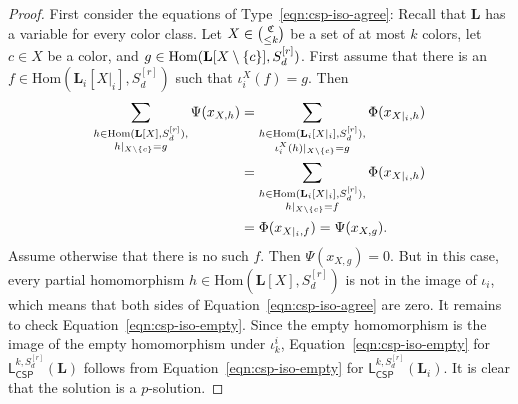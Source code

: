 \documentclass[a4paper,english, thm-restate]{lipics-v2021}
\DeclarePairedDelimiter\set{\lbrace}{\rbrace}
\newcommand{\StructL}{\mathbf{L}}
\newcommand{\restrict}[2]{#1|_{#2}}
\newcommand{\Hom}[2]{\mathrm{Hom}(#1,#2)}
\newcommand{\leqs}{\mathsf{L}}
\newcommand{\cspiso}[3]{\leqs^{#1,#2}_{\mathsf{CSP}}(#3)}
\newcommand{\colors}{\mathfrak{C}}
\newcommand{\CosetGrpTmplt}[2]{#1^{[#2]}}
\newcommand{\Sym}[1]{S_{#1}}
\newcommand{\SymStruct}[2]{\CosetGrpTmplt{\Sym{#1}}{#2}}
\begin{document}
	\begin{proof}
		First consider the equations of Type~\ref{eqn:csp-iso-agree}:
		Recall that $\StructL$
		has a variable for every color class.
		Let $X \in \tbinom{\colors}{\leq k}$ be a set of at most $k$ colors,
		let $c \in X$ be a color, and 
		$g \in \Hom{\StructL[X \setminus \set{c}]}{\SymStruct{d}{r}}$.
		First assume that there is an $f \in \Hom{\StructL_i[\restrict{X}{i}]}{\SymStruct{d}{r}}$ such that  $\iota_i^X(f) = g$. Then
		\begin{align*}
			\sum_{\substack{h\in \Hom{\StructL[X]}{\SymStruct{d}{r}},\\ \restrict{h}{X\setminus \set{c}}= g}} \Psi(x_{X,h})
			&= \sum_{\substack{h\in \Hom{\StructL_i[\restrict{X}{i}]}{\SymStruct{d}{r}},\\ \restrict{\iota_i^X(h)}{X \setminus \set{c}} = g}} \Phi(x_{\restrict{X}{i},h})\\
			&= \sum_{\substack{h\in \Hom{\StructL_i[\restrict{X}{i}]}{\SymStruct{d}{r}},\\ \restrict{h}{X\setminus \set{c}}= f}} \Phi(x_{\restrict{X}{i},h})\\
			&=\Phi(x_{\restrict{X}{i}, f}) = \Psi(x_{X,g}).
		\end{align*}
		Assume otherwise that there is no such $f$.
		Then $\Psi(x_{X, g}) = 0$.
		But in this case, every partial homomorphism $h\in \Hom{\StructL[X]}{\SymStruct{d}{r}}$
		is not in the image of $\iota_i$, which means that
		both sides of Equation~\ref{eqn:csp-iso-agree} are zero.
		It remains to check Equation~\ref{eqn:csp-iso-empty}.
		Since the empty homomorphism is the image of the empty homomorphism under $\iota^i_k$,
		Equation~\ref{eqn:csp-iso-empty} for $\cspiso{k}{\SymStruct{d}{r}}{\StructL}$
		follows from Equation~\ref{eqn:csp-iso-empty}
		for $\cspiso{k}{\SymStruct{d}{r}}{\StructL_i}$.
		It is clear that the solution is a $p$-solution.
	\end{proof}
	
\end{document}
